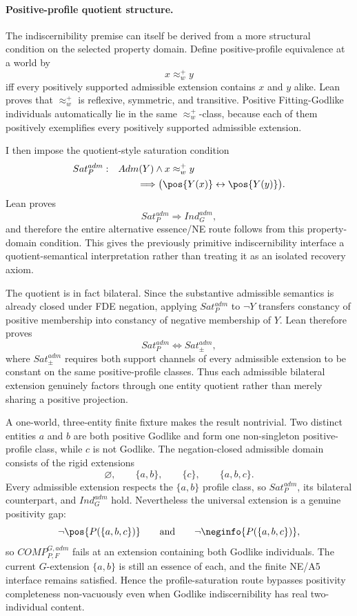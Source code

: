 \paragraph{Positive-profile quotient structure.}
The indiscernibility premise can itself be derived from a more structural condition on the selected property domain. Define positive-profile equivalence at a world by
\[
  x\approx_w^+ y
\]
iff every positively supported admissible extension contains \(x\) and \(y\) alike. Lean proves that \(\approx_w^+\) is reflexive, symmetric, and transitive. Positive Fitting-Godlike individuals automatically lie in the same \(\approx_w^+\)-class, because each of them positively exemplifies every positively supported admissible extension.

I then impose the quotient-style saturation condition
\[
\begin{split}
  Sat_P^{adm}:\quad
  &Adm(Y)\land x\approx_w^+y\\
  &\qquad\Longrightarrow
  \bigl(\pos{Y(x)}\leftrightarrow\pos{Y(y)}\bigr).
\end{split}
\]
Lean proves
\[
  Sat_P^{adm}\Longrightarrow Ind_G^{adm},
\]
and therefore the entire alternative essence/NE route follows from this property-domain condition. This gives the previously primitive indiscernibility interface a quotient-semantical interpretation rather than treating it as an isolated recovery axiom.

The quotient is in fact bilateral. Since the substantive admissible semantics is already closed under FDE negation, applying \(Sat_P^{adm}\) to \(\neg Y\) transfers constancy of positive membership into constancy of negative membership of \(Y\). Lean therefore proves
\[
\boxed{
  Sat_P^{adm}\Longleftrightarrow Sat_{\pm}^{adm},
}
\]
where \(Sat_{\pm}^{adm}\) requires both support channels of every admissible extension to be constant on the same positive-profile classes. Thus each admissible bilateral extension genuinely factors through one entity quotient rather than merely sharing a positive projection.

A one-world, three-entity finite fixture makes the result nontrivial. Two distinct entities \(a\) and \(b\) are both positive Godlike and form one non-singleton positive-profile class, while \(c\) is not Godlike. The negation-closed admissible domain consists of the rigid extensions
\[
  \varnothing,\qquad \{a,b\},\qquad \{c\},\qquad \{a,b,c\}.
\]
Every admissible extension respects the \(\{a,b\}\) profile class, so \(Sat_P^{adm}\), its bilateral counterpart, and \(Ind_G^{adm}\) hold. Nevertheless the universal extension is a genuine positivity gap:
\[
  \neg\pos{P(\{a,b,c\})}
  \qquad\text{and}\qquad
  \neg\neginfo{P(\{a,b,c\})},
\]
so \(COMP_{P,F}^{G,adm}\) fails at an extension containing both Godlike individuals. The current \(G\)-extension \(\{a,b\}\) is still an essence of each, and the finite NE/A5 interface remains satisfied. Hence the profile-saturation route bypasses positivity completeness non-vacuously even when Godlike indiscernibility has real two-individual content.

